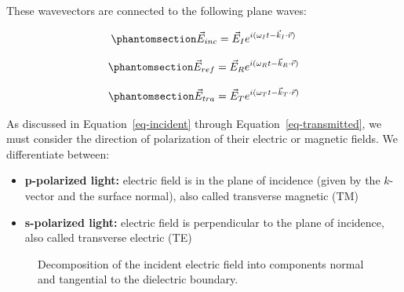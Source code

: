 \documentclass[
  a4paper,
]{book}
\providecommand{\tightlist}{%
  \setlength{\itemsep}{0pt}\setlength{\parskip}{0pt}}
\begin{document}
These wavevectors are connected to the following plane waves:

\begin{equation}\phantomsection\label{eq-incident}{
\vec{E}_{ inc}=\vec{E}_I e^{i(\omega_I t -\vec{k}_I\cdot \vec{r})}
}\end{equation}

\begin{equation}\phantomsection\label{eq-reflected}{
\vec{E}_{ ref}=\vec{E}_R e^{i(\omega_R t -\vec{k}_R\cdot \vec{r})}
}\end{equation}

\begin{equation}\phantomsection\label{eq-transmitted}{
\vec{E}_{ tra}=\vec{E}_T e^{i(\omega_T t -\vec{k}_T\cdot \vec{r})}
}\end{equation}

As discussed in Equation~\ref{eq-incident} through
Equation~\ref{eq-transmitted}, we must consider the direction of
polarization of their electric or magnetic fields. We differentiate
between:

\begin{itemize}
\tightlist
\item
  \textbf{p-polarized light:} electric field is in the plane of
  incidence (given by the \(k\)-vector and the surface normal), also
  called transverse magnetic (TM)
\item
  \textbf{s-polarized light:} electric field is perpendicular to the
  plane of incidence, also called transverse electric (TE)
\end{itemize}

\begin{figure}


\caption{\label{fig-pol-decomp}Decomposition of the incident electric
field into components normal and tangential to the dielectric boundary.}

\end{figure}%
\end{document}
